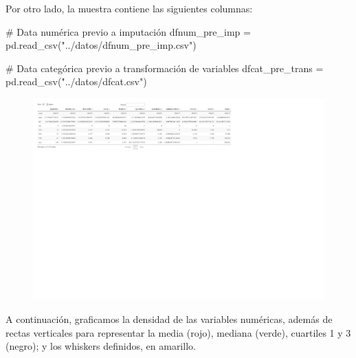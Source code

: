 \documentclass[
  letterpaper,
  DIV=11,
  numbers=noendperiod]{scrartcl}
\newenvironment{Shaded}{\begin{snugshade}}{\end{snugshade}}
\newcommand{\CommentTok}[1]{\textcolor[rgb]{0.38,0.45,0.64}{#1}}
\newcommand{\FunctionTok}[1]{\textcolor[rgb]{0.31,0.98,0.48}{#1}}
\newcommand{\NormalTok}[1]{\textcolor[rgb]{0.97,0.97,0.95}{#1}}
\newcommand{\OperatorTok}[1]{\textcolor[rgb]{0.97,0.97,0.95}{#1}}
\newcommand{\SpecialCharTok}[1]{\textcolor[rgb]{1.00,0.47,0.78}{#1}}
\newcommand{\StringTok}[1]{\textcolor[rgb]{0.95,0.98,0.55}{#1}}
\begin{document}
Por otro lado, la muestra contiene las siguientes columnas:

\begin{Shaded}
\begin{Highlighting}[]
\CommentTok{\# Data numérica previo a imputación}
\NormalTok{dfnum\_pre\_imp }\OperatorTok{=}\NormalTok{ pd.read\_csv(}\StringTok{"../datos/dfnum\_pre\_imp.csv"}\NormalTok{)}

\CommentTok{\# Data categórica previo a transformación de variables}
\NormalTok{dfcat\_pre\_trans }\OperatorTok{=}\NormalTok{ pd.read\_csv(}\StringTok{"../datos/dfcat.csv"}\NormalTok{)}
\end{Highlighting}
\end{Shaded}

\begin{Shaded}
\end{Shaded}

\begin{figure}[H]

{\centering \includegraphics{informe_01_files/figure-pdf/unnamed-chunk-6-1.pdf}

}

\end{figure}

A continuación, graficamos la densidad de las variables numéricas,
además de rectas verticales para representar la media (rojo), mediana
(verde), cuartiles 1 y 3 (negro); y los whiskers definidos, en amarillo.
\end{document}

